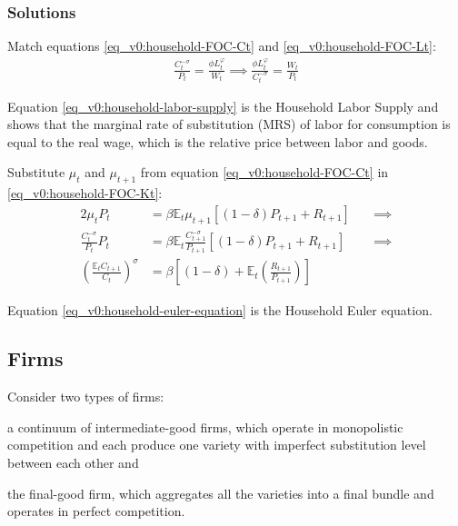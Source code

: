 \documentclass[../thesis.tex]{subfiles}
\begin{document}
	\subsubsection*{Solutions}
	
	Match equations \ref{eq_v0:household-FOC-Ct} and \ref{eq_v0:household-FOC-Lt}:
	\begin{align}
		\label{eq_v0:household-labor-supply}
		\frac{C_t^{-\sigma}}{P_t} = \frac{\phi L_t^{\varphi}}{W_t} \implies 
		\frac{\phi L_t^{\varphi}}{C_t^{-\sigma}} = \frac{W_t}{P_t}
	\end{align}
	
	Equation \ref{eq_v0:household-labor-supply} is the Household Labor Supply and shows that the marginal rate of substitution (MRS) of labor for consumption is equal to the real wage, which is the relative price between labor and goods.
	
	Substitute $\mu_t$ and $\mu_{t+1}$ from equation \ref{eq_v0:household-FOC-Ct} in \ref{eq_v0:household-FOC-Kt}:
	\begin{alignat}{2}
		\mu_t P_t & = \beta \mathbb{E}_t \mu_{t+1} [(1-\delta) P_{t+1} + R_{t+1}] \quad &\implies \nonumber \\
		\frac{C_t^{-\sigma}}{P_t} P_t & = \beta \mathbb{E}_t \frac{C_{t+1}^{-\sigma}}{P_{t+1}} [(1-\delta) P_{t+1} + R_{t+1}] &\implies \nonumber \\
		\left( \frac{\mathbb{E}_t C_{t+1}}{C_t} \right)^\sigma & = \beta \left[ (1-\delta) + \mathbb{E}_t \left(\frac{R_{t+1}}{P_{t+1}}\right) \right] \label{eq_v0:household-euler-equation}
	\end{alignat}
	
	Equation \ref{eq_v0:household-euler-equation} is the Household Euler equation.
	
	
\subsection{Firms}
	
	Consider two types of firms: 
	\begin{enumerate*}[label=(\arabic*)]
		\item a continuum of intermediate-good firms, which operate in monopolistic competition and each produce one variety with imperfect substitution level between each other and
		
		\item the final-good firm, which aggregates all the varieties into a final bundle and operates in perfect competition.
	\end{enumerate*}
	
\end{document}
